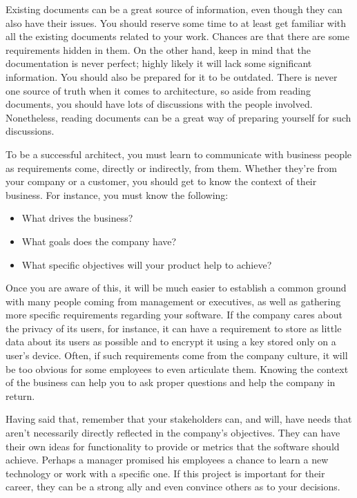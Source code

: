
Existing documents can be a great source of information, even though they can also have their issues. You should reserve some time to at least get familiar with all the existing documents related to your work. Chances are that there are some requirements hidden in them. On the other hand, keep in mind that the documentation is never perfect; highly likely it will lack some significant information. You should also be prepared for it to be outdated. There is never one source of truth when it comes to architecture, so aside from reading documents, you should have lots of discussions with the people involved. Nonetheless, reading documents can be a great way of preparing yourself for such discussions.


To be a successful architect, you must learn to communicate with business people as requirements come, directly or indirectly, from them. Whether they're from your company or a customer, you should get to know the context of their business. For instance, you must know the following:

\begin{itemize}
\item 
What drives the business?

\item 
What goals does the company have?

\item 
What specific objectives will your product help to achieve?
\end{itemize}

Once you are aware of this, it will be much easier to establish a common ground with many people coming from management or executives, as well as gathering more specific requirements regarding your software. If the company cares about the privacy of its users, for instance, it can have a requirement to store as little data about its users as possible and to encrypt it using a key stored only on a user's device. Often, if such requirements come from the company culture, it will be too obvious for some employees to even articulate them. Knowing the context of the business can help you to ask proper questions and help the company in return.

Having said that, remember that your stakeholders can, and will, have needs that aren't necessarily directly reflected in the company's objectives. They can have their own ideas for functionality to provide or metrics that the software should achieve. Perhaps a manager promised his employees a chance to learn a new technology or work with a specific one. If this project is important for their career, they can be a strong ally and even convince others as to your decisions.

